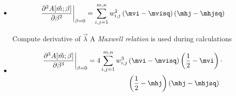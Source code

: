 \begin{frame}
  \begin{itemize}
    \item {}
    \[
      \left.\frac{\partial^2A{\left[\vec{m};\beta\right]}}{\partial\beta^2}\right|_{\beta=0}
      =\sum_{i,j=1}^{m,n} w_{i,j}^2\left(\mvi-\mvisq\right)\left(\mhj-\mhjsq\right)
    \]
    \begin{alertblock}{Compute derivative of \(\vec{\lambda}\)}
      A \emph{Maxwell relation} is used during calculations
    \end{alertblock}
    \item {}
    \begin{align*}
    \left.\frac{\partial^3A{\left[\vec{m};\beta\right]}}{\partial\beta^3}\right|_{\beta=0}
    = 4 \sum_{i,j=1}^{m,n} w_{i,j}^3&\left(\mvi-\mvisq\right) \left(\frac{1}{2}-\mvi\right) \cdot\\
    &\left(\frac{1}{2}-\mhj\right) \left(\mhj-\mhjsq\right)
    \end{align*}
  \end{itemize}
\end{frame}

